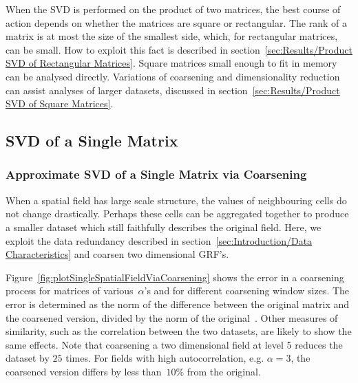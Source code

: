 \documentclass[ijgi,article,submit,moreauthors,pdftex,10pt,a4paper]{Definitions/mdpi}
\begin{document}
When the SVD is performed on the product of two matrices, the best course of action depends on whether the matrices are square or rectangular. The rank of a matrix is at most the size of the smallest side, which, for rectangular matrices, can be small. How to exploit this fact is described in section~\ref{sec:Results/Product SVD of Rectangular Matrices}. Square matrices small enough to fit in memory can be analysed directly. Variations of coarsening and dimensionality reduction can assist analyses of larger datasets, discussed in section~\ref{sec:Results/Product SVD of Square Matrices}.

\subsection{SVD of a Single Matrix} %
\label{sec:Results/SVD of a Single Matrix}

\subsubsection{Approximate SVD of a Single Matrix via Coarsening}
\label{sec:Results/Approximate SVD of a Single Matrix via Coarsening}

When a spatial field has large scale structure, the values of neighbouring cells do not change drastically. Perhaps these cells can be aggregated together to produce a smaller dataset which still faithfully describes the original field. Here, we exploit the data redundancy described in section~\ref{sec:Introduction/Data Characteristics} and coarsen two dimensional GRF's.

Figure~\ref{fig:plotSingleSpatialFieldViaCoarsening} shows the error in a coarsening process for matrices of various~$\alpha$'s and for different coarsening window sizes. The error is determined as the norm of the difference between the original matrix and the coarsened version, divided by the norm of the original~\cite{Bogaardt2018}. Other measures of similarity, such as the correlation between the two datasets, are likely to show the same effects. %
Note that coarsening a two dimensional field at level 5 reduces the dataset by $25$ times. For fields with high autocorrelation, e.g. $\alpha=3$, the coarsened version differs by less than~$10\%$ from the original.
\end{document}
